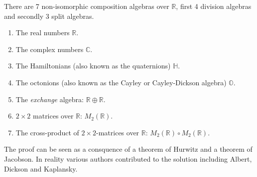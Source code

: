 \documentclass[12pt]{article}
\begin{document}
There are 7 non-isomorphic composition algebras over $\mathbb{R}$, first 4 division algebras and secondly 
3 split algebras.
\begin{enumerate}
\item The real numbers $\mathbb{R}$.
\item The complex numbers $\mathbb{C}$.
\item The Hamiltonians (also known as the quaternions) $\mathbb{H}$.
\item The octonions (also known as the Cayley or Cayley-Dickson algebra) $\mathbb{O}$.
\item The \emph{exchange} algebra: $\mathbb{R}\oplus\mathbb{R}$.
\item $2\times 2$ matrices over $\mathbb{R}$: $M_2(\mathbb{R})$.
\item The cross-product of $2\times 2$-matrices over $\mathbb{R}$: $M_2(\mathbb{R})\circ M_2(\mathbb{R})$.
\end{enumerate}

The proof can be seen as a consquence of a theorem of Hurwitz and a theorem of Jacobson.
In reality various authors contributed to the solution including Albert, Dickson and
Kaplansky.


\end{document}
